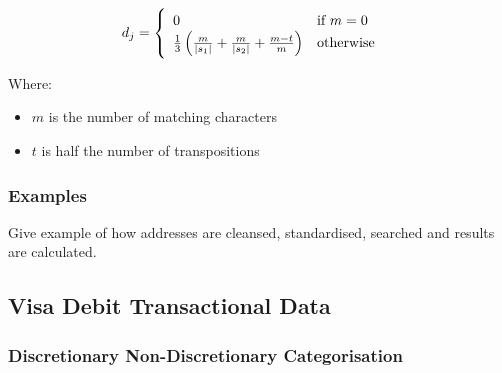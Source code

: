\begin{align}
 d_j =\begin{cases}
 \begin{array}{l l}
 	0 & \text{if }m = 0\\
 	\frac{1}{3}\left(\frac{m}{|s_1|} + \frac{m}{|s_2|} + \frac{m-t}{m}\right) & \text{otherwise} \end{array} \end{cases}
\end{align}

Where: 
\vspace{-7mm} 
\begin{itemize}
	\item $m$ is the number of matching characters 
 	\item $t$ is half the number of transpositions
\end{itemize}

\subsubsection{Examples}
Give example of how addresses are cleansed, standardised, searched and results are calculated.

\subsection{Visa Debit Transactional Data}
\subsubsection{Discretionary Non-Discretionary Categorisation}

